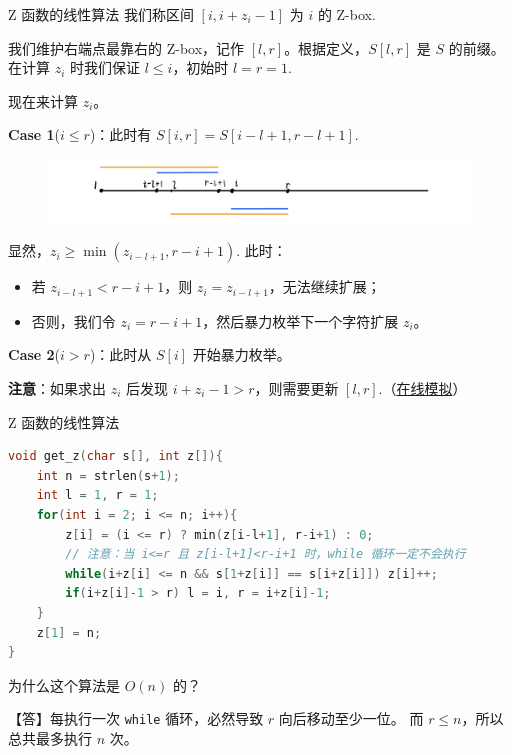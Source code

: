 \documentclass{beamer}
\begin{document}
\begin{frame}[fragile]{Z 函数的线性算法}
    \footnotesize
    我们称区间 $[i,i+z_i-1]$ 为 $i$ 的 Z-box.

    \vspace{1em}\pause
    我们维护右端点最靠右的 Z-box，记作 $[l,r]$。根据定义，$S[l,r]$ 是 $S$ 的前缀。
    在计算 $z_i$ 时我们保证 $l\leq i$，初始时 $l=r=1$.

    \vspace{1em}
    现在来计算 $z_i$。

    \pause\vspace{.5em}\textbf{Case 1}($i\leq r$)：此时有 $S[i,r]=S[i-l+1,r-l+1]$.
    \begin{figure}[H]
        \centering
        \includegraphics[width=\textwidth]{pic/exkmp-1.jpg}
    \end{figure}

    显然，$z_i\geq \min(z_{i-l+1},r-i+1)$. 此时：
    \begin{itemize}
        \pause \item 若 $z_{i-l+1}<r-i+1$，则 $z_i=z_{i-l+1}$，无法继续扩展；
        \pause \item 否则，我们令 $z_i=r-i+1$，然后暴力枚举下一个字符扩展 $z_i$。
    \end{itemize}

    \pause\vspace{.5em}\textbf{Case 2}($i> r$)：此时从 $S[i]$ 开始暴力枚举。

    \pause\vspace{.5em}\textbf{注意}：如果求出 $z_i$ 后发现 $i+z_i-1>r$，则需要更新 $[l,r]$.（\href{https://personal.utdallas.edu/~besp/demo/John2010/z-algorithm.htm}{在线模拟}）
\end{frame}

\begin{frame}[fragile]{Z 函数的线性算法}
    \small
    \begin{lstlisting}[language=c++]
void get_z(char s[], int z[]){
    int n = strlen(s+1);
    int l = 1, r = 1;
    for(int i = 2; i <= n; i++){
        z[i] = (i <= r) ? min(z[i-l+1], r-i+1) : 0;
        // 注意：当 i<=r 且 z[i-l+1]<r-i+1 时，while 循环一定不会执行
        while(i+z[i] <= n && s[1+z[i]] == s[i+z[i]]) z[i]++;
        if(i+z[i]-1 > r) l = i, r = i+z[i]-1;
    }
    z[1] = n;
}
    \end{lstlisting}

    \vspace{1em}\pause
    为什么这个算法是 $O(n)$ 的？

    \vspace{1em}\pause
    【答】每执行一次 \verb|while| 循环，必然导致 $r$ 向后移动至少一位。
    而 $r\leq n$，所以总共最多执行 $n$ 次。
\end{frame}
\end{document}
